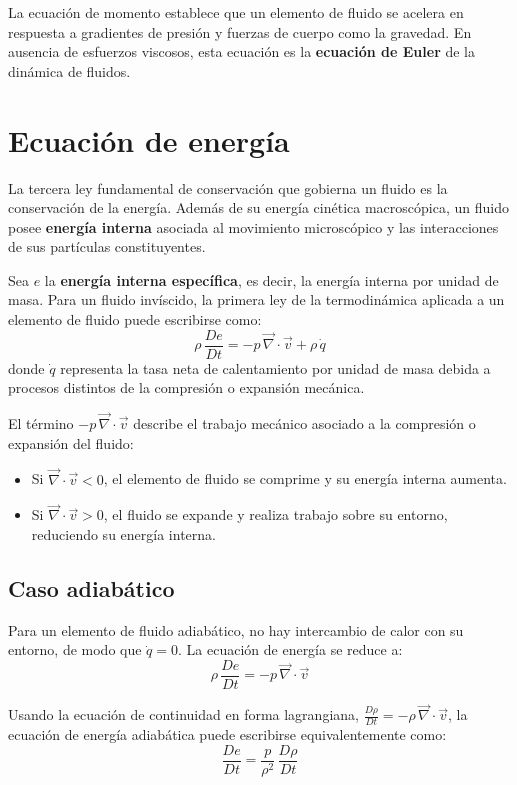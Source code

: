 La ecuación de momento establece que un elemento de fluido se acelera en respuesta a gradientes de presión y fuerzas de cuerpo como la gravedad. En ausencia de esfuerzos viscosos, esta ecuación es la \textbf{ecuación de Euler} de la dinámica de fluidos.

\section{Ecuación de energía}

La tercera ley fundamental de conservación que gobierna un fluido es la conservación de la energía. Además de su energía cinética macroscópica, un fluido posee \textbf{energía interna} asociada al movimiento microscópico y las interacciones de sus partículas constituyentes.

Sea $e$ la \textbf{energía interna específica}, es decir, la energía interna por unidad de masa. Para un fluido invíscido, la primera ley de la termodinámica aplicada a un elemento de fluido puede escribirse como:
$$
\rho\,\frac{De}{Dt} = -p\,\vec{\nabla}\cdot\vec{v} + \rho\,\dot{q}
$$
donde $\dot{q}$ representa la tasa neta de calentamiento por unidad de masa debida a procesos distintos de la compresión o expansión mecánica.

El término $-p\,\vec{\nabla}\cdot\vec{v}$ describe el trabajo mecánico asociado a la compresión o expansión del fluido:
\begin{itemize}
    \item Si $\vec{\nabla}\cdot\vec{v} < 0$, el elemento de fluido se comprime y su energía interna aumenta.
    \item Si $\vec{\nabla}\cdot\vec{v} > 0$, el fluido se expande y realiza trabajo sobre su entorno, reduciendo su energía interna.
\end{itemize}

\subsection{Caso adiabático}

Para un elemento de fluido adiabático, no hay intercambio de calor con su entorno, de modo que $\dot{q} = 0$. La ecuación de energía se reduce a:
$$
\rho\,\frac{De}{Dt} = -p\,\vec{\nabla}\cdot\vec{v}
$$

Usando la ecuación de continuidad en forma lagrangiana, $\displaystyle\frac{D\rho}{Dt} = -\rho\,\vec{\nabla}\cdot\vec{v}$, la ecuación de energía adiabática puede escribirse equivalentemente como:
$$
\frac{De}{Dt} = \frac{p}{\rho^2}\,\frac{D\rho}{Dt}
$$

